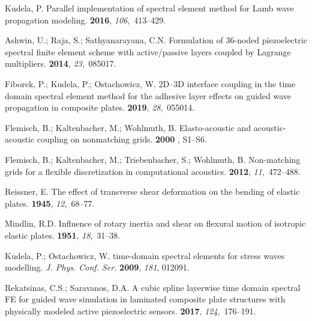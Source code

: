 \documentclass[sensors,article,accept,moreauthors,pdftex]{Definitions/mdpi}
\begin{document}
\begin{thebibliography}{999}
Kudela, P.
\newblock Parallel implementation of spectral element method for Lamb wave
  propagation modeling.
 {\bf 2016}, {\em 106},~413--429.

Ashwin, U.; Raja, S.; Sathyanarayana, C.N.
\newblock Formulation of 36-noded piezoelectric spectral finite element scheme
  with active/passive layers coupled by {Lagrange} multipliers.
 {\bf 2014}, {\em 23},~085017.

Fiborek, P.; Kudela, P.; Ostachowicz, W.
\newblock 2D--3D interface coupling in the time domain spectral element method
  for the adhesive layer effects on guided wave propagation in composite
  plates.
 {\bf 2019}, {\em 28},~055014.

Flemisch, B.; Kaltenbacher, M.; Wohlmuth, B.
\newblock Elasto-acoustic and acoustic-acoustic coupling on nonmatching grids.
 {\bf 2000}%
,  S1--S6.

Flemisch, B.; Kaltenbacher, M.; Triebenbacher, S.; Wohlmuth, B.
\newblock Non-matching grids for a flexible discretization in computational
  acoustics.
 {\bf 2012}, {\em 11},~472--488.

Reissner, E.
\newblock The effect of transverse shear deformation on the bending of elastic
  plates.
 {\bf 1945}, {\em 12},~68--77.

Mindlin, R.D.
\newblock Influence of rotary inertia and shear on flexural motion of isotropic
  elastic plates.
 {\bf 1951}, {\em 18},~31--38.

Kudela, P.; Ostachowicz, W.
 time-domain spectral elements for stress waves modelling.
\newblock  \emph{J. Phys. Conf. Ser.}  \textbf{2009}, \emph{181}, 012091.

Rekatsinas, C.S.; Saravanos, D.A.
\newblock A cubic spline layerwise time domain spectral FE for guided wave
  simulation in laminated composite plate structures with physically modeled
  active piezoelectric sensors.
 {\bf 2017}, {\em 124},~176--191.


\end{thebibliography}
\end{document}
